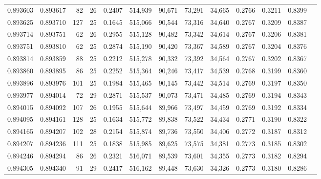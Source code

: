 \begin{tabular}{rrrrrrrrrrrrr}
0.893603 & 0.893617 &    82 &  26 &                                     0.2407 & 514,939 &  90,671 &  73,291 &  34,665 & 0.2766 & 0.3211 & 0.8399 \\
0.893625 & 0.893710 &   127 &  25 &                                     0.1645 & 515,066 &  90,544 &  73,316 &  34,640 & 0.2767 & 0.3209 & 0.8387 \\
0.893714 & 0.893751 &    62 &  26 &                                     0.2955 & 515,128 &  90,482 &  73,342 &  34,614 & 0.2767 & 0.3206 & 0.8381 \\
0.893751 & 0.893810 &    62 &  25 &                                     0.2874 & 515,190 &  90,420 &  73,367 &  34,589 & 0.2767 & 0.3204 & 0.8376 \\
0.893814 & 0.893859 &    88 &  25 &                                     0.2212 & 515,278 &  90,332 &  73,392 &  34,564 & 0.2767 & 0.3202 & 0.8367 \\
0.893860 & 0.893895 &    86 &  25 &                                     0.2252 & 515,364 &  90,246 &  73,417 &  34,539 & 0.2768 & 0.3199 & 0.8360 \\
0.893896 & 0.893976 &   101 &  25 &                                     0.1984 & 515,465 &  90,145 &  73,442 &  34,514 & 0.2769 & 0.3197 & 0.8350 \\
0.893977 & 0.894014 &    72 &  29 &                                     0.2871 & 515,537 &  90,073 &  73,471 &  34,485 & 0.2769 & 0.3194 & 0.8343 \\
0.894015 & 0.894092 &   107 &  26 &                                     0.1955 & 515,644 &  89,966 &  73,497 &  34,459 & 0.2769 & 0.3192 & 0.8334 \\
0.894095 & 0.894161 &   128 &  25 &                                     0.1634 & 515,772 &  89,838 &  73,522 &  34,434 & 0.2771 & 0.3190 & 0.8322 \\
0.894165 & 0.894207 &   102 &  28 &                                     0.2154 & 515,874 &  89,736 &  73,550 &  34,406 & 0.2772 & 0.3187 & 0.8312 \\
0.894207 & 0.894236 &   111 &  25 &                                     0.1838 & 515,985 &  89,625 &  73,575 &  34,381 & 0.2773 & 0.3185 & 0.8302 \\
0.894246 & 0.894294 &    86 &  26 &                                     0.2321 & 516,071 &  89,539 &  73,601 &  34,355 & 0.2773 & 0.3182 & 0.8294 \\
0.894305 & 0.894340 &    91 &  29 &                                     0.2417 & 516,162 &  89,448 &  73,630 &  34,326 & 0.2773 & 0.3180 & 0.8286 \\

\end{tabular}
